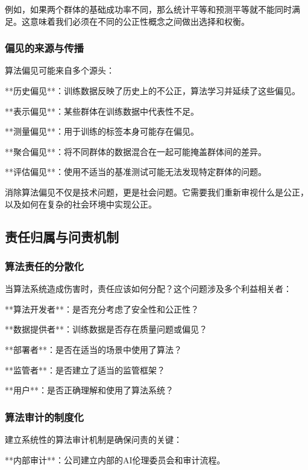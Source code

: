 例如，如果两个群体的基础成功率不同，那么统计平等和预测平等就不能同时满足。这意味着我们必须在不同的公正性概念之间做出选择和权衡。

\subsubsection{偏见的来源与传播}

算法偏见可能来自多个源头：

**历史偏见**：训练数据反映了历史上的不公正，算法学习并延续了这些偏见。

**表示偏见**：某些群体在训练数据中代表性不足。

**测量偏见**：用于训练的标签本身可能存在偏见。

**聚合偏见**：将不同群体的数据混合在一起可能掩盖群体间的差异。

**评估偏见**：使用不适当的基准测试可能无法发现特定群体的问题。

\begin{center}
消除算法偏见不仅是技术问题，更是社会问题。它需要我们重新审视什么是公正，以及如何在复杂的社会环境中实现公正。
\end{center}

\subsection{责任归属与问责机制}

\subsubsection{算法责任的分散化}

当算法系统造成伤害时，责任应该如何分配？这个问题涉及多个利益相关者：

**算法开发者**：是否充分考虑了安全性和公正性？

**数据提供者**：训练数据是否存在质量问题或偏见？

**部署者**：是否在适当的场景中使用了算法？

**监管者**：是否建立了适当的监管框架？

**用户**：是否正确理解和使用了算法系统？

\subsubsection{算法审计的制度化}

建立系统性的算法审计机制是确保问责的关键：

**内部审计**：公司建立内部的AI伦理委员会和审计流程。


